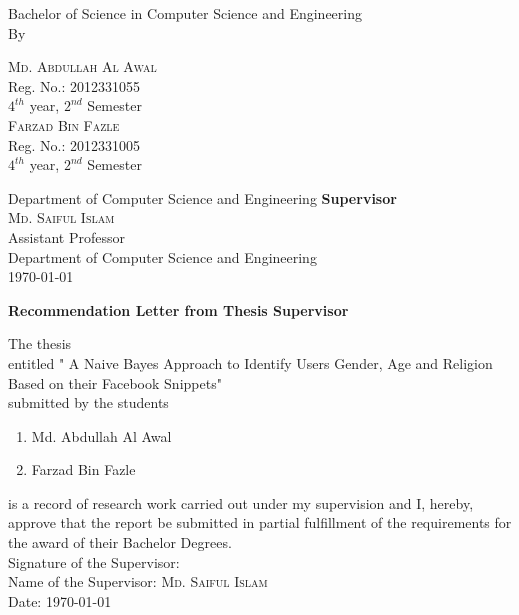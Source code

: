 \documentclass{standalone}
\begin{document}
\begin{titlepage}
\begin{center}
        {\Large Bachelor of Science in Computer Science and Engineering}\\
				\vfill
				{\LARGE By}\\
        \begin{multicols}{2}
        \textsc{\Large Md. Abdullah Al Awal }\\
        Reg. No.: 2012331055\\ $4^{th}$ year, $2^{nd}$ Semester\\
				\textsc{\Large Farzad Bin Fazle} \\
        Reg. No.: 2012331005\\ $4^{th}$ year, $2^{nd}$ Semester\\ 
				\end{multicols}
				Department of Computer Science and Engineering
				\vfill
        {\bf Supervisor}\\
				\textsc{\Large Md. Saiful Islam} \\
        Assistant Professor\\ 
				Department of Computer Science and Engineering\\
        \vfill
        \today
        \end{center}
				\newpage
				\begin{center}
					\textbf{\huge Recommendation Letter from Thesis Supervisor}
				\end{center}
				\noindent
				The thesis
				\\
				entitled "{ A Naive Bayes Approach to Identify Users Gender, Age and Religion Based on their Facebook Snippets}"
				\\
				submitted by the students
				\begin{enumerate}
					\item Md. Abdullah Al Awal
					\item Farzad Bin Fazle
				\end{enumerate}
				is a record of research work carried out under my supervision and I, hereby, approve that the report be submitted in partial fulfillment of the requirements for the award of their Bachelor Degrees.\\

				\vspace{2.0cm}
				\noindent
				Signature of the Supervisor: \\
				Name of the Supervisor: \textsc{\large Md. Saiful Islam}\\%
				Date: \today
				

\end{titlepage}
\end{document}
